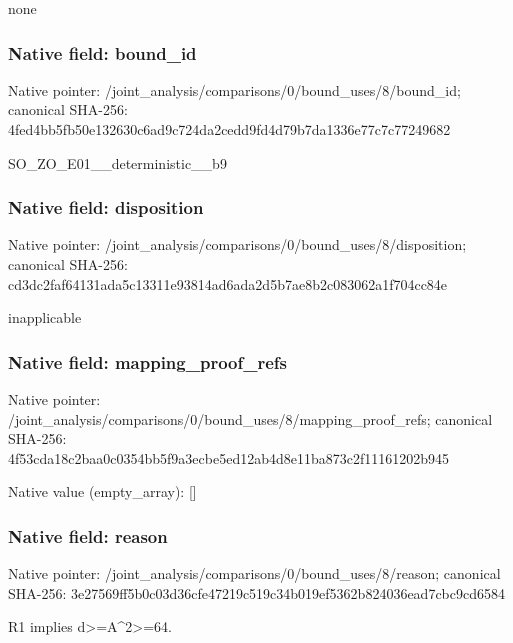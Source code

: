 \documentclass[10pt,a4paper]{article}
\begin{document}
\begingroup\raggedright\sloppy none\par\endgroup

\subsubsection{Native field: bound\_\allowbreak{}id}
Native pointer: /joint\_\allowbreak{}analysis/comparisons/0/bound\_\allowbreak{}uses/8/bound\_\allowbreak{}id; canonical SHA-256: 4fed4bb5fb50e132630c6ad9c724da2cedd9fd4d79b7da1336e77c7c77249682

\begingroup\raggedright\sloppy SO\_\allowbreak{}ZO\_\allowbreak{}E01\_\allowbreak{}\_\allowbreak{}deterministic\_\allowbreak{}\_\allowbreak{}b9\par\endgroup

\subsubsection{Native field: disposition}
Native pointer: /joint\_\allowbreak{}analysis/comparisons/0/bound\_\allowbreak{}uses/8/disposition; canonical SHA-256: cd3dc2faf64131ada5c13311e93814ad6ada2d5b7ae8b2c083062a1f704cc84e

\begingroup\raggedright\sloppy inapplicable\par\endgroup

\subsubsection{Native field: mapping\_\allowbreak{}proof\_\allowbreak{}refs}
Native pointer: /joint\_\allowbreak{}analysis/comparisons/0/bound\_\allowbreak{}uses/8/mapping\_\allowbreak{}proof\_\allowbreak{}refs; canonical SHA-256: 4f53cda18c2baa0c0354bb5f9a3ecbe5ed12ab4d8e11ba873c2f11161202b945

Native value (empty\_\allowbreak{}array): []

\subsubsection{Native field: reason}
Native pointer: /joint\_\allowbreak{}analysis/comparisons/0/bound\_\allowbreak{}uses/8/reason; canonical SHA-256: 3e27569ff5b0c03d36cfe47219c519c34b019ef5362b824036ead7cbc9cd6584

\begingroup\raggedright\sloppy R1 implies d>=\allowbreak{}A\textasciicircum{}2>=\allowbreak{}64.\par\endgroup
\end{document}
